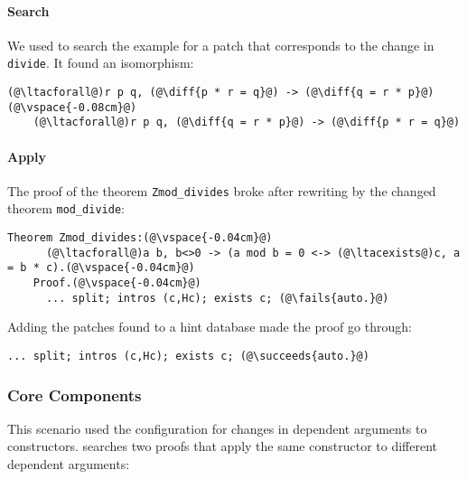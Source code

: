 \paragraph{Search} We used \sysname to search the example for a patch
that corresponds to the change in \lstinline{divide}.
It found an isomorphism:

\begin{lstlisting}[language=coq]
    (@\ltacforall@)r p q, (@\diff{p * r = q}@) -> (@\diff{q = r * p}@)(@\vspace{-0.08cm}@)
    (@\ltacforall@)r p q, (@\diff{q = r * p}@) -> (@\diff{p * r = q}@)
\end{lstlisting}

\paragraph{Apply} The proof of the theorem \lstinline{Zmod_divides} broke after rewriting by the changed theorem \lstinline{mod_divide}:

\begin{lstlisting}[language=coq]
    Theorem Zmod_divides:(@\vspace{-0.04cm}@)
      (@\ltacforall@)a b, b<>0 -> (a mod b = 0 <-> (@\ltacexists@)c, a = b * c).(@\vspace{-0.04cm}@)
    Proof.(@\vspace{-0.04cm}@)
      ... split; intros (c,Hc); exists c; (@\fails{auto.}@)
\end{lstlisting}

Adding the patches \sysname found to a hint database made the proof go through:

\begin{lstlisting}[language=coq]
      ... split; intros (c,Hc); exists c; (@\succeeds{auto.}@)
\end{lstlisting}


\subsubsection{Core Components}

This scenario used the configuration for changes in dependent arguments to constructors.
\sysname searches two proofs that apply the same constructor
to different dependent arguments:

